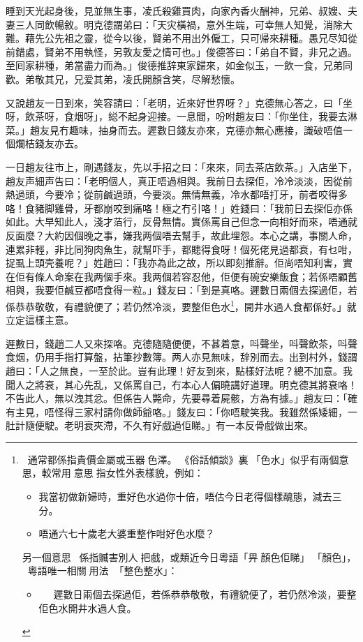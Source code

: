 \documentclass[a5paper, 12pt, openany]{book} %
\begin{document}
	睡到天光起身後，見並無生事，凌氏殺雞買肉，向家內香火酬神，兄弟、叔嫂、夫妻三人同飲暢敘。明克德謂弟曰：「天灾橫禍，意外生端，可幸無人知覺，消除大難。藉先公先祖之靈，從今以後，賢弟不用出外僱工，只可帰來耕種。愚兄尽知從前錯處，賢弟不用執怪，另敦友愛之情可也。」俊德答曰：「弟自不賢，非兄之過。至囘家耕種，弟當盡力而為。」俊德推辞東家歸來，如金似玉，一飲一食，兄弟同歡。弟敬其兄，兄爱其弟，凌氏開顏含笑，尽解愁懷。

	又說趙友一日到來，笑容請曰：「老明，近來好世界呀？」克德無心答之，曰「坐呀，飲茶呀，食烟呀」，縂不起身迎接。一息間，吩咐趙友曰：「你坐住，我要去淋菜。」趙友見冇趣味，抽身而去。遲數日錢友亦來，克德亦無心應接，識破唔值一個爛桔錢友亦去。

	一日趙友往市上，剛遇錢友，先以手招之曰：「來來，同去茶店飲茶。」入店坐下，趙友声細声告曰：「老明個人，真正唔過相與。我前日去探佢，冷冷淡淡，因從前熱過頭，今要冷；從前鹹過頭，今要淡。無情無義，冷水都唔打牙，前者咬得多咯！食豬脚雞骨，牙都崩咬到痛咯！極之冇引咯！」姓錢曰：「我前日去探佢亦係如此。大早知此人，淺才萡行，反骨無情。實係罵自己但念一向相好而來，唔通就反面麼？大約因個晚之事，嫌我两個唔去幫手，故此埋怨。本心之講，事關人命，連累非輕，非比同狗肉魚生，就幫吓手，都贃得食呀！個死佬見過都衰，有乜咁，捉虱上頭壳養呢？」姓趙曰：「我亦為此之故，所以即刻推辭。佢尚唔知利害，實在佢有條人命案在我两個手來。我两個若容忍他，佢便有碗安樂飯食；若係唔顧舊相與，我要佢鹹豆都唔食得一粒。」錢友曰：「到是真咯。遲數日兩個去探過佢，若係恭恭敬敬，有禮貌便了；若仍然冷淡，要整佢色水\footnote{󱛖󱀱通常都係指貴價金屬或玉器󱝚色澤。󱪙《俗話傾談》裏󰊺「色水」似乎有兩個意思，較常用󱝚意思󱪙指女性外表樣貌，例如：
  \begin{itemize}[itemsep=0pt, parsep=0pt]
  \item 我當初做新婦時，重好色水過你十倍，唔估今日老得個樣醜態，減去三分。
  \item 唔通六七十歲老大婆重整作咁好色水麼？
  \end{itemize}
  另一個意思󰳞，係指贓害別人󱝚把戲，或類近今日粵語「畀顏色佢睇」󱝚「顏色」，󱛖󱩑粵語唯一相關󱝚用法「整色整水」：
  \begin{itemize}[itemsep=0pt, parsep=0pt]
  \item   遲數日兩個去探過佢，若係恭恭敬敬，有禮貌便了，若仍然冷淡，要整佢色水開井水過人食。
  \end{itemize}
  }，開井水過人食都係好。」就立定這樣主意。

	遲數日，錢趙二人又來探咯。克德隨隨便便，不甚着意，呌聲坐，呌聲飲茶，呌聲食烟，仍用手指打算盤，拈筆抄數簿。两人亦見無味，辞別而去。出到村外，錢謂趙曰：「人之無良，一至於此。豈有此理！好友到來，點樣好法呢？總不加意。我聞人之將衰，其心先乱，又係罵自己，冇本心人偏曉講好道理。明克德其將衰咯！不告此人，無以洩其忿。但係告人斃命，先要尋着屍骸，方為有據。」趙友曰：「確有主見，唔怪得三家村請你做師爺咯。」錢友曰：「你唔駛笑我。我雖然係矮細，一肚計隨便駛。老明衰夾滯，不久有好戲過佢睇。」有一本反骨戲做出來。
\end{document}
